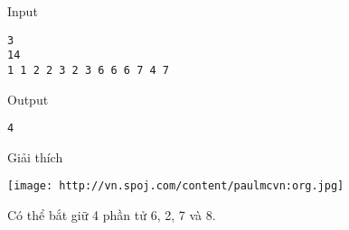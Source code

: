 Input
\begin{verbatim}
3
14
1 1 2 2 3 2 3 6 6 6 7 4 7\end{verbatim}

Output
\begin{verbatim}
4\end{verbatim}

Giải thích


\texttt{[image: http://vn.spoj.com/content/paulmcvn:org.jpg]}

Có thể bắt giữ 4 phần tử 6, 2, 7 và 8.
